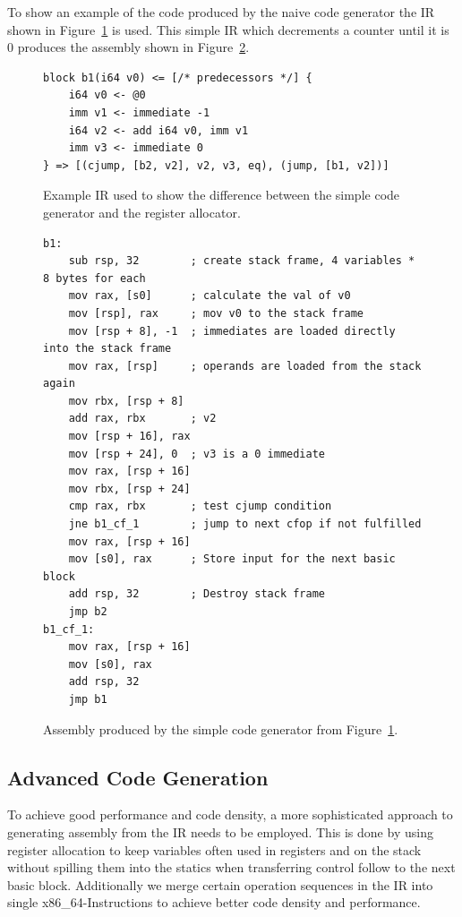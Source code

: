 \documentclass[course=eragp]{aspdoc}
\begin{document}
\par

To show an example of the code produced by the naive code generator the IR shown in Figure~\ref{fig:example_ir} is used.
This simple IR which decrements a counter until it is 0 produces the assembly shown in Figure~\ref{fig:naive_gen_asm}.
\begin{figure}
    \centering
    \begin{lstlisting}[]
block b1(i64 v0) <= [/* predecessors */] {
    i64 v0 <- @0
    imm v1 <- immediate -1
    i64 v2 <- add i64 v0, imm v1
    imm v3 <- immediate 0
} => [(cjump, [b2, v2], v2, v3, eq), (jump, [b1, v2])]
\end{lstlisting}
    \caption{Example IR used to show the difference between the simple code generator and the register allocator.}\label{fig:example_ir}
\end{figure}

\begin{figure}[h]
    \centering
    \begin{lstlisting}[language={[x86masm]Assembler}]
b1:
    sub rsp, 32        ; create stack frame, 4 variables * 8 bytes for each
    mov rax, [s0]      ; calculate the val of v0
    mov [rsp], rax     ; mov v0 to the stack frame
    mov [rsp + 8], -1  ; immediates are loaded directly into the stack frame
    mov rax, [rsp]     ; operands are loaded from the stack again
    mov rbx, [rsp + 8]
    add rax, rbx       ; v2
    mov [rsp + 16], rax
    mov [rsp + 24], 0  ; v3 is a 0 immediate
    mov rax, [rsp + 16]
    mov rbx, [rsp + 24]
    cmp rax, rbx       ; test cjump condition
    jne b1_cf_1        ; jump to next cfop if not fulfilled
    mov rax, [rsp + 16]
    mov [s0], rax      ; Store input for the next basic block
    add rsp, 32        ; Destroy stack frame
    jmp b2
b1_cf_1:
    mov rax, [rsp + 16]
    mov [s0], rax
    add rsp, 32
    jmp b1
\end{lstlisting}
    \caption{Assembly produced by the simple code generator from Figure~\ref{fig:example_ir}.}\label{fig:naive_gen_asm}
\end{figure}

\subsection{Advanced Code Generation}
To achieve good performance and code density, a more sophisticated approach to generating assembly from the IR needs to be employed.
This is done by using register allocation to keep variables often used in registers and on the stack without spilling them into the statics when transferring control follow
to the next basic block. Additionally we merge certain operation sequences in the IR into single x86\_64-Instructions to achieve better code density and performance.
\end{document}
